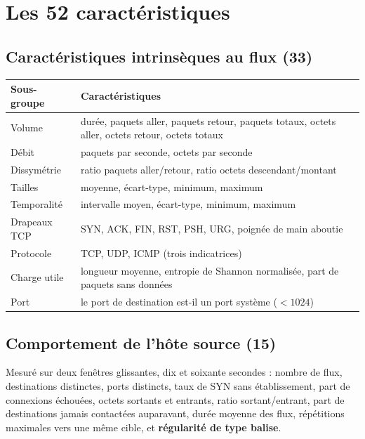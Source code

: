 \documentclass[11pt,a4paper]{article}
\begin{document}
\section{Les 52 caractéristiques}

\subsection{Caractéristiques intrinsèques au flux (33)}

\begin{table}[h]\centering\small
\begin{tabularx}{\linewidth}{@{}l X@{}}
\toprule
\textbf{Sous-groupe} & \textbf{Caractéristiques} \\
\midrule
Volume & durée, paquets aller, paquets retour, paquets totaux, octets aller, octets retour,
octets totaux \\
Débit & paquets par seconde, octets par seconde \\
Dissymétrie & ratio paquets aller/retour, ratio octets descendant/montant \\
Tailles & moyenne, écart-type, minimum, maximum \\
Temporalité & intervalle moyen, écart-type, minimum, maximum \\
Drapeaux TCP & SYN, ACK, FIN, RST, PSH, URG, poignée de main aboutie \\
Protocole & TCP, UDP, ICMP (trois indicatrices) \\
Charge utile & longueur moyenne, entropie de Shannon normalisée, part de paquets sans données \\
Port & le port de destination est-il un port système ($<1024$) \\
\bottomrule
\end{tabularx}
\end{table}

\subsection{Comportement de l'hôte source (15)}

Mesuré sur deux fenêtres glissantes, dix et soixante secondes : nombre de flux, destinations
distinctes, ports distincts, taux de SYN sans établissement, part de connexions échouées, octets
sortants et entrants, ratio sortant/entrant, part de destinations jamais contactées auparavant,
durée moyenne des flux, répétitions maximales vers une même cible, et \textbf{régularité de type
balise}.
\end{document}

